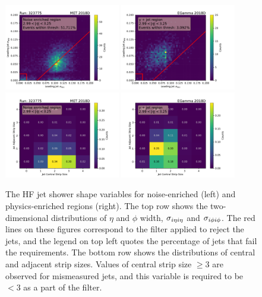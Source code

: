 \begin{figure}[htbp]
    \centering
    \includegraphics[width=0.45\textwidth]{HFFilter/merged_2022-04-11_hlt_11Apr22_MET_2018D/MET_2018D_sieie_sipip_ak4_abseta0_2_99_3_25_noise_enriched_mht_110.pdf}
    \includegraphics[width=0.45\textwidth]{HFFilter/merged_2022-04-12_hlt_11Apr22_EGamma_2018D/EGamma_2018D_sieie_sipip_ak4_abseta0_2_99_3_25_gammajet.pdf} \\
    \includegraphics[width=0.45\textwidth]{HFFilter/merged_2022-04-11_hlt_11Apr22_MET_2018D/MET_2018D_cssize_adssize_ak4_abseta0_2_99_3_25_noise_enriched_mht_110.pdf}
    \includegraphics[width=0.45\textwidth]{HFFilter/merged_2022-04-12_hlt_11Apr22_EGamma_2018D/EGamma_2018D_cssize_adssize_ak4_abseta0_2_99_3_25_gammajet.pdf}
    \caption{The HF jet shower shape variables for noise-enriched (left) and physics-enriched regions (right).
    The top row shows the two-dimensional distributions of $\eta$ and $\phi$ width, $\sigma_{i\eta i\eta}$ and $\sigma_{i\phi i\phi}$. The red lines on these
    figures correspond to the filter applied to reject the jets, and the legend on top left quotes the percentage of jets that fail the requirements.
    The bottom row shows the distributions of central and adjacent strip sizes. Values of central strip size $\geq3$ are observed for mismeasured
    jets, and this variable is required to be $< 3$ as a part of the filter.}
    \label{fig:hf_variables_hlt}
\end{figure}

